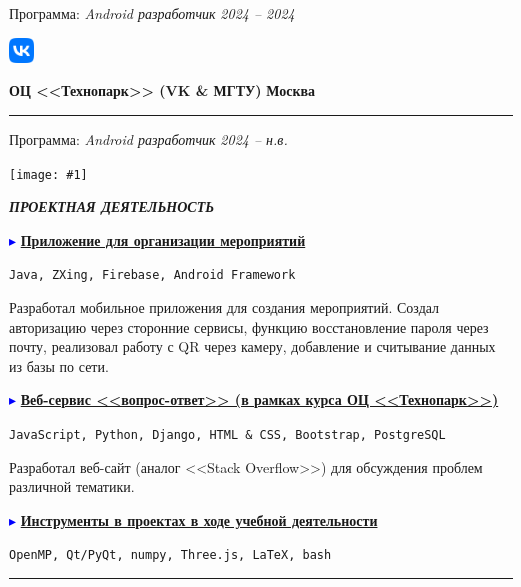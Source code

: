 \documentclass[a4paper, 10pt]{extarticle}
\newcommand{\Technologies}[1]{
    \begin{tcolorbox}[
        colback=blue!5,
        colframe=black,
        fonttitle=\bfseries,
        title=Технологии
    ]
    \texttt{\small{#1}}
    \end{tcolorbox}
}
\newcommand{\Sep}{
    \noindent\hdashrule[0.5ex]{\columnwidth}{1pt}{1mm 1pt}
}
\newcommand{\SubTitle}[2]{
    \parbox{1.75em}{
        \texttt{[image: \#1]}
    }\textbf{\textit{\MakeUppercase{#2}}}
}
\begin{document}
\begin{paracol}{2}
\begin{rightcolumn}
{                Программа: \textit{Android разработчик}
                \hfill \textit{2024 -- 2024} 
            }
            \vspace{1em}

            \noindent\parbox{0.1\columnwidth}{
                \includegraphics[width=0.05\textwidth]{img/vk_logo.png}
            }
            \parbox{0.89\columnwidth}{
                \textbf{ОЦ <<Технопарк>> (VK \& МГТУ)}
                \hfill \textbf{Москва}
                \hrule
                \vspace{0.5em}

                Программа: \textit{Android разработчик}
                \hfill \textit{2024 -- н.в.} 
            }

            \Sep
            \begin{center}
                \SubTitle{img/project.png}{Проектная деятельность}
            \end{center}
            \vspace{-1em}
            \textcolor{blue}{$\blacktriangleright$}
            \textbf{\underline{Приложение для организации мероприятий}}
            
            \Technologies{Java, ZXing, Firebase, Android Framework}
            
            \noindent Разработал мобильное приложения для создания мероприятий.
            Создал авторизацию через сторонние сервисы, функцию восстановление пароля через почту,
            реализовал работу с QR через камеру, добавление и считывание данных из базы по сети.
            
            \noindent\textcolor{blue}{$\blacktriangleright$} 
            \textbf{\underline{Веб-сервис <<вопрос-ответ>> (в рамках курса ОЦ <<Технопарк>>)}}
        
            \Technologies{JavaScript, Python, Django, HTML \& CSS, Bootstrap, PostgreSQL}
            
            \noindent Разработал веб-сайт (аналог <<Stack Overflow>>) для обсуждения проблем различной тематики.

            \noindent\textcolor{blue}{$\blacktriangleright$}
            \noindent\textbf{\underline{Инструменты в проектах в ходе учебной деятельности}}
            
            \Technologies{OpenMP, Qt/PyQt, numpy, Three.js, LaTeX, bash}

        \end{rightcolumn}
    \end{paracol}
    \vspace{1em}

    \noindent\rule{\textwidth}{1.25pt}
\end{document}
